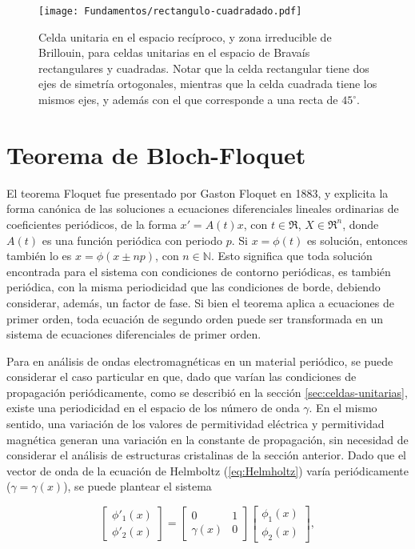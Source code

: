 \begin{figure}[htp]
	\centering
	\texttt{[image: Fundamentos/rectangulo-cuadradado.pdf]}
	\caption{Celda unitaria en el espacio recíproco, y zona irreducible de Brillouin, para celdas unitarias en el espacio de Bravaís rectangulares y cuadradas. Notar que la celda rectangular tiene dos ejes de simetría ortogonales, mientras que la celda cuadrada tiene los mismos ejes, y además con el que corresponde a una recta de $45^{\circ}$.}
	\label{fig:rectangulo-cuadrado}
\end{figure}

\section{Teorema de Bloch-Floquet}
\label{sec:bloch-floquet}


El teorema Floquet fue presentado por Gaston Floquet en 1883, y explicita la forma canónica de las soluciones a ecuaciones diferenciales lineales ordinarias de coeficientes periódicos, de la forma $x' = A(t)x$, con $t \in \Re$, $X \in \Re^n$, donde $A(t)$ es una función periódica con periodo $p$. Si $x=\phi(t)$ es solución, entonces también lo es $x=\phi(x\pm np)$, con $n \in \mathbb{N}$. Esto significa que toda solución encontrada para el sistema con condiciones de contorno periódicas, es también periódica, con la misma periodicidad que las condiciones de borde, debiendo considerar, además, un factor de fase. Si bien el teorema aplica a ecuaciones de primer orden, toda ecuación de segundo orden puede ser transformada en un sistema de ecuaciones diferenciales de primer orden.

Para en análisis de ondas electromagnéticas en un material periódico, se puede considerar el caso particular en que, dado que varían las condiciones de propagación periódicamente, como se describió en la sección \ref{sec:celdas-unitarias}, existe una periodicidad en el espacio de los número de onda $\gamma$. En el mismo sentido, una variación de los valores de permitividad eléctrica y permitividad magnética generan una variación en la constante de propagación, sin necesidad de considerar el análisis de estructuras cristalinas de la sección anterior. Dado que el vector de onda de la ecuación de Helmboltz (\ref{eq:Helmholtz}) varía periódicamente ($\gamma = \gamma(x)$), se puede plantear el sistema

\begin{equation}
	\begin{bmatrix}
		\phi'_1(x) \\
		\phi'_2(x)
	\end{bmatrix}
	=
	\begin{bmatrix}
		0 & 1 \\
		\gamma(x) & 0
	\end{bmatrix}
	\begin{bmatrix}
		\phi_1(x) \\
		\phi_2(x)
	\end{bmatrix},
\end{equation}

